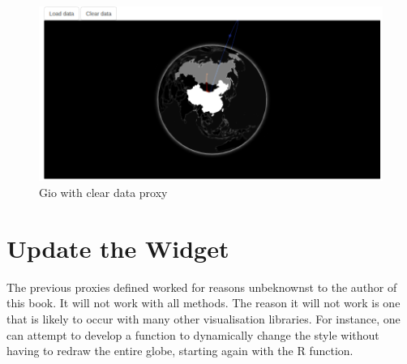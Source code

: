 \documentclass[
]{krantz}
\makeatletter
\newenvironment{Shaded}{\begin{snugshade}}{\end{snugshade}}
\newcommand{\CommentTok}[1]{\textcolor[rgb]{0.37,0.37,0.37}{\textit{#1}}}
\newcommand{\ControlFlowTok}[1]{\textcolor[rgb]{0.27,0.27,0.27}{\textbf{#1}}}
\newcommand{\DataTypeTok}[1]{\textcolor[rgb]{0.27,0.27,0.27}{#1}}
\newcommand{\KeywordTok}[1]{\textcolor[rgb]{0.27,0.27,0.27}{\textbf{#1}}}
\newcommand{\NormalTok}[1]{#1}
\newcommand{\OperatorTok}[1]{\textcolor[rgb]{0.43,0.43,0.43}{\textbf{#1}}}
\newcommand{\StringTok}[1]{\textcolor[rgb]{0.5,0.5,0.5}{#1}}
\newenvironment{kframe}{%
\medskip{}
\setlength{\fboxsep}{.8em}
 \def\at@end@of@kframe{}%
 \ifinner\ifhmode%
  \def\at@end@of@kframe{\end{minipage}}%
  \begin{minipage}{\columnwidth}%
 \fi\fi%
 \def\FrameCommand##1{\hskip\@totalleftmargin \hskip-\fboxsep
 \colorbox{shadecolor}{##1}\hskip-\fboxsep
     \hskip-\linewidth \hskip-\@totalleftmargin \hskip\columnwidth}%
 \MakeFramed {\advance\hsize-\width
   \@totalleftmargin\z@ \linewidth\hsize
   \@setminipage}}%
 {\par\unskip\endMakeFramed%
 \at@end@of@kframe}
\renewenvironment{Shaded}{\begin{kframe}}{\end{kframe}}
\makeatother
\begin{document}
\begin{figure}[t]

{\centering \includegraphics[width=1\linewidth]{images/gio-shiny-clear} 

}

\caption{Gio with clear data proxy}\label{fig:giod-shiny-clear-data}
\end{figure}

\hypertarget{shiny-widgets-update}{%
\section{Update the Widget}\label{shiny-widgets-update}}

The previous proxies defined worked for reasons unbeknownst to the author of this book. It will not work with all methods. The reason it will not work is one that is likely to occur with many other visualisation libraries. For instance, one can attempt to develop a function to dynamically change the style without having to redraw the entire globe, starting again with the R function.

\begin{Shaded}
\end{Shaded}
\end{document}
